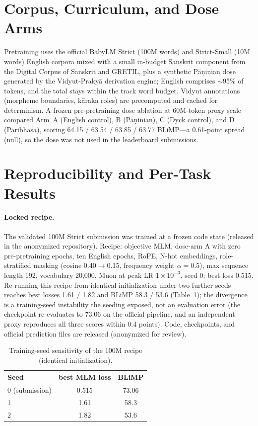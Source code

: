\documentclass[11pt]{article}
\begin{document}
\section{Corpus, Curriculum, and Dose Arms}
\label{app:data}
Pretraining uses the official BabyLM Strict (100M words) and Strict-Small (10M words) English corpora mixed with a small in-budget Sanskrit component from the Digital Corpus of Sanskrit and GRETIL, plus a synthetic P\=a\d{n}inian dose generated by the Vidyut-Praky\=a derivation engine; English comprises $\sim$95\% of tokens, and the total stays within the track word budget. Vidyut annotations (morpheme boundaries, k\=araka roles) are precomputed and cached for determinism. A frozen pre-pretraining dose ablation at 60M-token proxy scale compared Arm~A (English control), B (P\=a\d{n}inian), C (Dyck control), and D (Paribh\=a\d{s}\=a), scoring 64.15 / 63.54 / 63.85 / 63.77 BLiMP---a 0.61-point spread (null), so the dose was not used in the leaderboard submissions.

\section{Reproducibility and Per-Task Results}
\label{app:repro}
\paragraph{Locked recipe.} The validated 100M Strict submission was trained at a frozen code state (released in the anonymized repository). Recipe: objective MLM, dose-arm A with zero pre-pretraining epochs, ten English epochs, RoPE, N-hot embeddings, role-stratified masking (cosine 0.40$\to$0.15, frequency weight $\alpha=0.5$), max sequence length 192, vocabulary 20{,}000, Muon at peak LR $1\times10^{-3}$, seed 0; best loss 0.515. Re-running this recipe from identical initialization under two further seeds reaches best losses 1.61 / 1.82 and BLiMP 58.3 / 53.6 (Table~\ref{tab:seedrepro}); the divergence is a training-seed instability the seeding exposed, not an evaluation error (the checkpoint re-evaluates to 73.06 on the official pipeline, and an independent proxy reproduces all three scores within 0.4 points). Code, checkpoints, and official prediction files are released (anonymized for review).

\begin{table}[h]
\centering\small
\caption{Training-seed sensitivity of the 100M recipe (identical initialization).}
\label{tab:seedrepro}
\begin{tabular}{lcc}
\toprule
Seed & best MLM loss & BLiMP \\
\midrule
0 (submission) & 0.515 & 73.06 \\
1 & 1.61 & 58.3 \\
2 & 1.82 & 53.6 \\
\bottomrule
\end{tabular}
\end{table}
\end{document}
